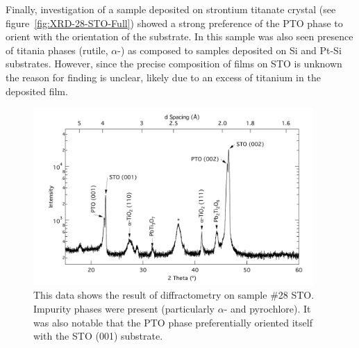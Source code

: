 Finally, investigation of a sample deposited on strontium titanate crystal (see figure~\vref{fig:XRD-28-STO-Full}) showed a strong preference of the PTO phase to orient with the orientation of the substrate. In this sample was also seen presence of titania phases (rutile, $\alpha$-) as composed to samples deposited on Si and Pt-Si substrates. However, since the precise composition of films on STO is unknown the reason for finding  is unclear, likely due to an excess of titanium in the deposited film. 

\begin{figure}[htbp]
	\centering
	\includegraphics[width=0.95\textwidth]{./Figures/Data/XRD/Run-28-STO/15-60}
	\caption[XRD Scan of \#28 on STO]%
		{This data shows the result of diffractometry on sample \#28 STO. Impurity phases were present %
		(particularly $\alpha$- and pyrochlore). It was also notable that the PTO phase preferentially %
		oriented itself with the STO (001) substrate.}
	\label{fig:XRD-28-STO-Full}
\end{figure}

















